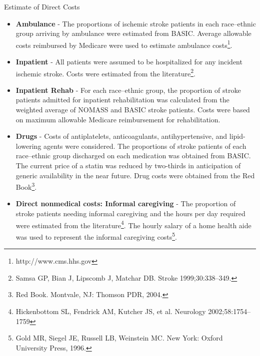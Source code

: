 \documentclass[10pt, xcolor=table]{beamer}
\begin{document}
\begin{frame}{Estimate of Direct Costs}
	\scriptsize
	\begin{itemize}
		\item \textbf{Ambulance} - The proportions of ischemic stroke patients in each race–ethnic group arriving by ambulance were estimated from BASIC. Average allowable costs reimbursed by Medicare were used to estimate ambulance costs\footnote{\label{note1}http://www.cms.hhs.gov}.
		\item \textbf{Inpatient} - All patients were assumed to be hospitalized for any incident ischemic stroke. Costs were estimated from the literature\footnote{Samsa GP, Bian J, Lipscomb J, Matchar DB. Stroke 1999;30:338–349.}.
		\item \textbf{Inpatient Rehab} - For each race–ethnic group, the proportion of stroke patients admitted for inpatient rehabilitation was calculated from the weighted average of NOMASS and BASIC stroke patients. Costs were based on maximum allowable Medicare reimbursement for rehabilitation\footnotemark[2].
		\item \textbf{Drugs} - Costs of antiplatelets, anticoagulants, antihypertensive, and lipid-lowering agents were considered. The proportions of stroke patients of each race–ethnic group discharged on each medication was obtained from BASIC. The current price of a statin was reduced by two-thirds in anticipation of generic availability in the near future. Drug costs were obtained from the Red Book\footnote{Red Book. Montvale, NJ: Thomson PDR, 2004.}.
		\item \textbf{Direct nonmedical costs: Informal caregiving} - The proportion of stroke patients needing informal caregiving and the hours per day required were estimated from the literature\footnote{Hickenbottom SL, Fendrick AM, Kutcher JS, et al. Neurology 2002;58:1754–1759}. The hourly salary of a home health aide was used to represent the informal caregiving costs\footnote{Gold MR, Siegel JE, Russell LB, Weinstein MC. New York: Oxford University Press, 1996.}.
	\end{itemize}
\end{frame}
\end{document}
